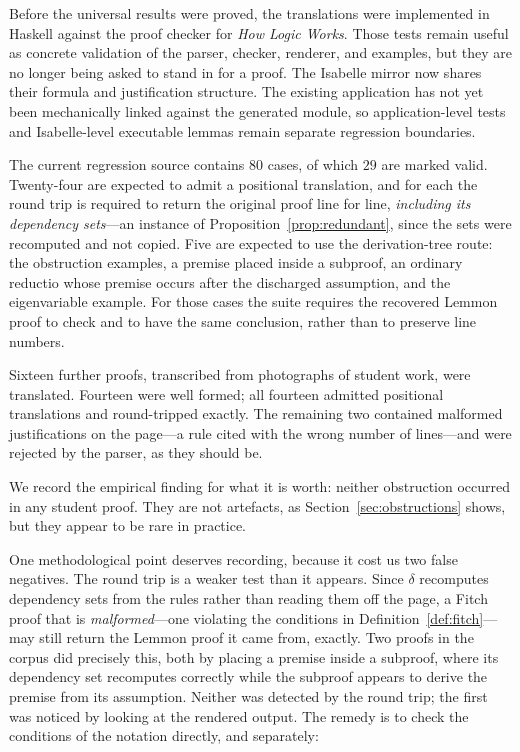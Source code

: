 \documentclass[11pt]{article}
\theoremstyle{plain}
\theoremstyle{definition}
\theoremstyle{remark}
\begin{document}
Before the universal results were proved, the translations were implemented
in Haskell against the proof checker for \emph{How Logic Works}. Those tests
remain useful as concrete validation of the parser, checker, renderer, and
examples, but they are no longer being asked to stand in for a proof. The
Isabelle mirror now shares their formula and justification structure. The
existing application has not yet been mechanically linked against the
generated module, so application-level tests and Isabelle-level executable
lemmas remain separate regression boundaries.

The current regression source contains $80$ cases, of which $29$ are marked
valid. Twenty-four are expected to admit a positional translation, and for
each the round trip is required to return the original proof line for line,
\emph{including its dependency sets}---an instance of
Proposition~\ref{prop:redundant}, since the sets were recomputed and not
copied. Five are expected to use the derivation-tree route: the obstruction
examples, a premise placed inside a subproof, an ordinary reductio whose
premise occurs after the discharged assumption, and the eigenvariable example.
For those cases the suite requires the recovered Lemmon proof to check and to
have the same conclusion, rather than to preserve line numbers.

Sixteen further proofs, transcribed from photographs of student work, were
translated. Fourteen were well formed; all fourteen admitted positional
translations and round-tripped exactly. The remaining two contained malformed
justifications on the page---a rule cited with the wrong number of
lines---and were rejected by the parser, as they should be.

We record the empirical finding for what it is worth: neither obstruction
occurred in any student proof. They are not artefacts, as
Section~\ref{sec:obstructions} shows, but they appear to be rare in practice.

One methodological point deserves recording, because it cost us two false
negatives. The round trip is a weaker test than it appears. Since $\delta$
recomputes dependency sets from the rules rather than reading them off the
page, a Fitch proof that is \emph{malformed}---one violating the conditions in
Definition~\ref{def:fitch}---may still return the Lemmon proof it came from,
exactly. Two proofs in the corpus did precisely this, both by placing a
premise inside a subproof, where its dependency set recomputes correctly while
the subproof appears to derive the premise from its assumption. Neither was
detected by the round trip; the first was noticed by looking at the rendered
output. The remedy is to check the conditions of the notation directly, and
separately:
\end{document}
